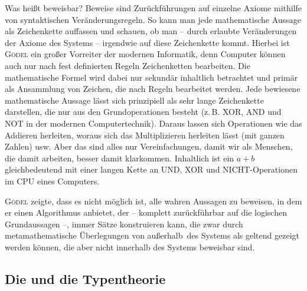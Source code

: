 Was heißt \frq beweisbar\flq? Beweise sind Zurückführungen auf einzelne Axiome mithilfe
von syntaktischen Veränderungsregeln.
So kann man jede mathematische Aussage als Zeichenkette
auffassen und schauen, ob man -- durch erlaubte Veränderungen der Axiome des Systems --
irgendwie auf diese Zeichenkette kommt. Hierbei ist \textsc{Gödel} ein großer Vorreiter der
modernen Informatik, denn Computer können auch nur nach fest definierten Regeln
Zeichenketten bearbeiten. Die mathematische Formel wird dabei nur sekundär
inhaltlich
betrachtet und primär als Ansammlung von Zeichen, die nach Regeln bearbeitet werden.
Jede bewiesene mathematische Aussage lässt sich prinzipiell als sehr lange Zeichenkette
darstellen, die nur aus den Grundoperationen besteht (z.\,B. XOR, AND und NOT in
der modernen Computertechnik). Daraus lassen sich Operationen wie das Addieren
herleiten, woraus sich das Multiplizieren herleiten lässt (mit ganzen Zahlen) usw.
Aber das sind alles nur Vereinfachungen, damit wir als Menschen, die damit arbeiten,
besser damit klarkommen. Inhaltlich ist ein $a + b$ gleichbedeutend mit einer langen
Kette an UND, XOR und NICHT-Operationen im CPU eines Computers.

\textsc{Gödel} zeigte, dass es nicht möglich ist, alle wahren Aussagen zu beweisen,
in dem er einen Algorithmus anbietet, der -- komplett zurückführbar auf die logischen
Grundaussagen --, immer Sätze konstruieren kann, die zwar durch metamathematische
Überlegungen von \frq außerhalb\flq\ des Systems
als geltend gezeigt werden können, die aber nicht innerhalb des Systems beweisbar sind.

\subsection*{Die  und die Typentheorie}

